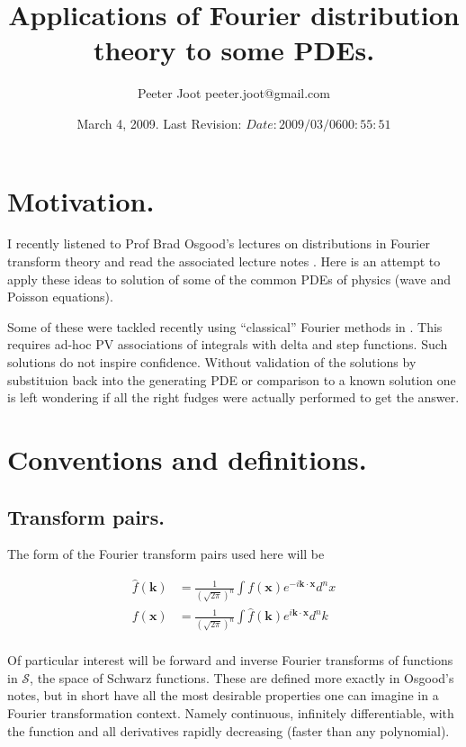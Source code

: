 \documentclass{article}
\title{ Applications of Fourier distribution theory to some PDEs. }
\author{Peeter Joot \quad peeter.joot@gmail.com }
\date{ March 4, 2009.  Last Revision: $Date: 2009/03/06 00:55:51 $ }
\newcommand{\Sw}[0]{\mathcal{S}}
\begin{document}
\maketitle{}
\tableofcontents

\section{ Motivation. }

I recently listened to Prof Brad Osgood's lectures on distributions in Fourier
transform theory and read the associated lecture notes
\cite{osgoodFourier}.  Here is an attempt to apply these ideas to solution
of some of the common PDEs of physics (wave and Poisson equations).

Some of these were tackled recently using ``classical'' Fourier methods
in \cite{PJpoisson}. 
This requires ad-hoc PV associations of integrals with delta and step
functions.  Such solutions do not inspire confidence.  Without
validation of the solutions by substituion back into the generating PDE
or comparison to a known solution one is left wondering
if all the right fudges were actually performed to get the answer.

\section{ Conventions and definitions. }

\subsection{ Transform pairs. }

The form of the Fourier transform pairs used here will be

\begin{align*}
\hat{f}(\mathbf{k}) &= \frac{1}{(\sqrt{2\pi})^n} \int f(\mathbf{x}) e^{-i \mathbf{k} \cdot \mathbf{x} } d^n x \\
{f}(\mathbf{x}) &= \frac{1}{(\sqrt{2\pi})^n} \int \hat{f}(\mathbf{k}) e^{i \mathbf{k} \cdot \mathbf{x} } d^n k \\
\end{align*}

Of particular interest will be forward and inverse Fourier transforms
of functions in $\Sw$, the space of Schwarz functions.  These are defined
more exactly in Osgood's notes, but in short have all the most desirable
properties one can imagine in a Fourier transformation context.  Namely
continuous, infinitely differentiable, with the function and all 
derivatives rapidly decreasing (faster than any polynomial).
\end{document}
